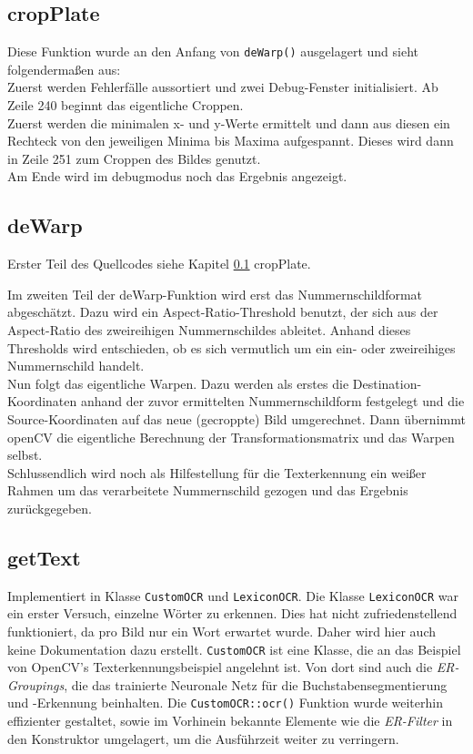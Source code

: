\documentclass{../Vorlage/sebDenCls}
\begin{document}
\subsection{cropPlate}
\label{croppl}
Diese Funktion wurde an den Anfang von \texttt{deWarp()} ausgelagert und sieht folgendermaßen aus:\\

Zuerst werden Fehlerfälle aussortiert und zwei Debug-Fenster initialisiert. Ab Zeile 240 beginnt das eigentliche Croppen. \\
Zuerst werden die minimalen x- und y-Werte ermittelt und dann aus diesen ein Rechteck von den jeweiligen Minima bis Maxima aufgespannt. Dieses wird dann in Zeile 251 zum Croppen des Bildes genutzt.\\
Am Ende wird im debugmodus noch das Ergebnis angezeigt.
\subsection{deWarp}
\label{dewarp}
Erster Teil des Quellcodes siehe Kapitel \ref{croppl} cropPlate.

Im zweiten Teil der deWarp-Funktion wird erst das Nummernschildformat abgeschätzt. Dazu wird ein Aspect-Ratio-Threshold benutzt, der sich aus der Aspect-Ratio des zweireihigen Nummernschildes ableitet. Anhand dieses Thresholds wird entschieden, ob es sich vermutlich um ein ein- oder zweireihiges Nummernschild handelt.\\
Nun folgt das eigentliche Warpen. Dazu werden als erstes die Destination-Koordinaten anhand der zuvor ermittelten Nummernschildform festgelegt und die Source-Koordinaten auf das neue (gecroppte) Bild umgerechnet. Dann übernimmt openCV die eigentliche Berechnung der Transformationsmatrix und das Warpen selbst.\\
Schlussendlich wird noch als Hilfestellung für die Texterkennung ein weißer Rahmen um das verarbeitete Nummernschild gezogen und das Ergebnis zurückgegeben.

\subsection{getText}
Implementiert in Klasse \texttt{CustomOCR} und \texttt{LexiconOCR}.
Die Klasse \texttt{LexiconOCR} war ein erster Versuch, einzelne Wörter zu erkennen. Dies hat nicht zufriedenstellend funktioniert, da pro Bild nur ein Wort erwartet wurde. Daher wird hier auch keine Dokumentation dazu erstellt.
\texttt{CustomOCR} ist eine Klasse, die an das Beispiel von OpenCV's Texterkennungsbeispiel angelehnt ist. Von dort sind auch die \textit{ER-Groupings}, die das trainierte Neuronale Netz für die Buchstabensegmentierung und -Erkennung beinhalten. Die \texttt{CustomOCR::ocr()} Funktion wurde weiterhin effizienter gestaltet, sowie im Vorhinein bekannte Elemente wie die \textit{ER-Filter} in den Konstruktor umgelagert, um die Ausführzeit weiter zu verringern.
\end{document}
